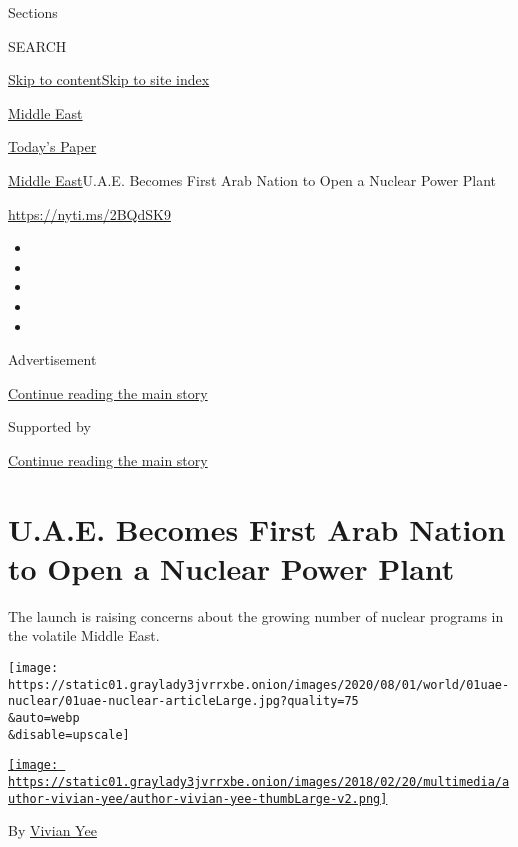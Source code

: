 Sections

SEARCH

\protect\hyperlink{site-content}{Skip to
content}\protect\hyperlink{site-index}{Skip to site index}

\href{https://www.nytimes3xbfgragh.onion/section/world/middleeast}{Middle
East}

\href{https://myaccount.nytimes3xbfgragh.onion/auth/login?response_type=cookie\&client_id=vi}{}

\href{https://www.nytimes3xbfgragh.onion/section/todayspaper}{Today's
Paper}

\href{/section/world/middleeast}{Middle East}\textbar{}U.A.E. Becomes
First Arab Nation to Open a Nuclear Power Plant

\url{https://nyti.ms/2BQdSK9}

\begin{itemize}
\item
\item
\item
\item
\item
\end{itemize}

Advertisement

\protect\hyperlink{after-top}{Continue reading the main story}

Supported by

\protect\hyperlink{after-sponsor}{Continue reading the main story}

\hypertarget{uae-becomes-first-arab-nation-to-open-a-nuclear-power-plant}{%
\section{U.A.E. Becomes First Arab Nation to Open a Nuclear Power
Plant}\label{uae-becomes-first-arab-nation-to-open-a-nuclear-power-plant}}

The launch is raising concerns about the growing number of nuclear
programs in the volatile Middle East.

\texttt{[image: https://static01.graylady3jvrrxbe.onion/images/2020/08/01/world/01uae-nuclear/01uae-nuclear-articleLarge.jpg?quality=75\\\&auto=webp\\\&disable=upscale]}

\href{https://www.nytimes3xbfgragh.onion/by/vivian-yee}{\texttt{[image: https://static01.graylady3jvrrxbe.onion/images/2018/02/20/multimedia/author-vivian-yee/author-vivian-yee-thumbLarge-v2.png]}}

By \href{https://www.nytimes3xbfgragh.onion/by/vivian-yee}{Vivian Yee}

